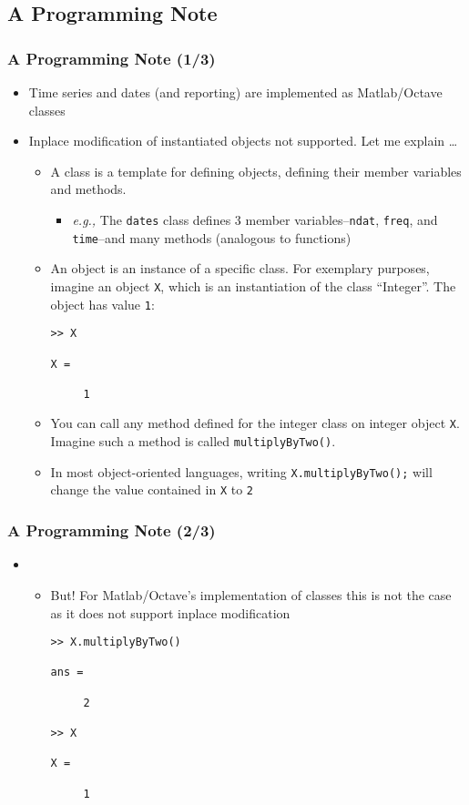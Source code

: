 \documentclass[10pt]{beamer}
\newcommand{\myitem}{\item[$\bullet$]}
\begin{document}
\subsection{A Programming Note}
\begin{frame}[fragile,t]
  \frametitle{A Programming Note (1/3)}
  \begin{itemize}
  \myitem Time series and dates (and reporting) are implemented as Matlab/Octave classes
  \myitem Inplace modification of instantiated objects not supported. Let me explain \dots
    \begin{itemize}
      \myitem A class is a template for defining objects, defining their member
      variables and methods.
      \begin{itemize}
        \myitem \textit{e.g.,} The \texttt{dates} class defines 3 member
        variables--\texttt{ndat}, \texttt{freq}, and \texttt{time}--and many
        methods (analogous to functions)
      \end{itemize}
      \myitem An object is an instance of a specific class. For exemplary
      purposes, imagine an object \texttt{X}, which is an instantiation of the
      class ``Integer''. The object has value \texttt{1}:
\begin{verbatim}
>> X

X =

     1
\end{verbatim}
    \myitem You can call any method defined for the integer class on integer
    object \texttt{X}. Imagine such a method is called
    \texttt{multiplyByTwo()}.
    \myitem In most object-oriented
    languages, writing \texttt{X.multiplyByTwo();} will change the value
    contained in \texttt{X} to \texttt{2}
    \end{itemize}
  \end{itemize}
\end{frame}


\begin{frame}[fragile,t]
  \frametitle{A Programming Note (2/3)}
  \begin{itemize}
    \item[] \begin{itemize}
  \myitem But! For Matlab/Octave's implementation of classes this is not the
    case as it does not support inplace modification
\begin{verbatim}
>> X.multiplyByTwo()

ans =

     2

>> X

X =

     1
\end{verbatim}
  \end{itemize}
  \end{itemize}
\end{frame}
\end{document}
